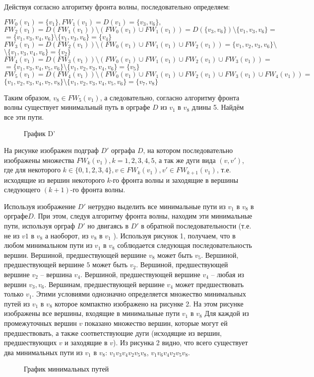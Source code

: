 \documentclass[12pt, letterpaper, titlepage]{article}
\begin{document}
Действуя согласно алгоритму фронта волны, последовательно определяем:

$FW_0(v_1)=\{v_1\}, FW_1(v_1)=D(v_1)=\{v_3,v_6\},$\\
$FW_2(v_1)=D(FW_1(v_1)) \setminus (FW_0(v_1) \cup FW_1(v_1))=D(\{v_3,v_6\}) \setminus \{v_1,v_3,v_6\}=$\\
$=\{v_1,v_3,v_4,v_6\} \setminus \{v_1,v_3,v_6\}=\{v_4\}$\\
$FW_3(v_1)=D(FW_2(v_1)) \setminus (FW_0(v_1)\cup FW_1(v_1)\cup FW_2(v_1))=\{v_1,v_2,v_3,v_6\} \setminus$\\
$\setminus \{v_1,v_3,v_4,v_6\}=\{v_2\}$\\
$FW_4(v_1)=D(FW_3(v_1)) \setminus (FW_0(v_1)\cup FW_1(v_1)\cup FW_2(v_1)\cup FW_3(v_1))=$\\
$=\{v_1,v_3,v_4,v_5,v_6\} \setminus \{v_1,v_2,v_3,v_4,v_6\}=\{v_5\}$\\
$FW_5(v_1)=D(FW_4(v_1)) \setminus (FW_0(v_1)\cup FW_1(v_1)\cup FW_2(v_1)\cup FW_3(v_1)\cup FW_4(v_1))=$\\
$\{v_1,v_2,v_3,v_4,v_7,v_8\}\setminus \{v_1,v_2,v_3,v_4,v_5,v_6\}=\{v_7,v_8\}$

Таким образом, $v_8 \in FW_5(v_1)$, а следовательно, согласно алгоритму фронта волны существует минимальный
путь в орграфе $D$ из $v_1$ в $v_8$ длины 5. Найдём все эти пути.
\begin{figure}[H]\centering\caption{График D'}\end{figure}
На рисунке изображен подграф $D'$ орграфа $D$, на котором последовательно изображены множества
$FW_k(v_1), k=1,2,3,4,5$, а так же  дуги вида $(v, v')$, где для некоторого $k \in \{0,1,2,3,4\},
v \in FW_k(v_1), v' \in FW_{k+1}(v_1)$, т.е. исходящие из вершин некоторого $k$-го фронта волны и
заходящие в вершины следующего $(k+1)$-го фронта волны.

Используя изображение $D'$ нетрудно выделить все минимальные пути из $v_1$ в $v_8$
в орграфе$D$. При этом, следуя алгоритму фронта волны, находим эти минимальные пути, используя орграф $D'$
но двигаясь в $D'$ в обратной последовательности (т.е. не из $v1$ в $v_8$ а наоборот, из $v_8$
в $v_1$ ). Используя рисунок 1, получаем, что в любом минимальном пути из $v_1$ в $v_8$
соблюдается следующая последовательность вершин. Вершиной, предшествующей
вершине $v_8$ может быть $v_5$. Вершиной, предшествующей вершине $5$
может быть $v_2$. Вершиной, предшествующей вершине $v_2$ – вершина $v_4$. 
Вершиной, предшествующей вершине $v_4$ – любая из вершин $v_3,v_6$. 
Вершинам, предшествующей вершине $v_4$ может предшествовать только $v_1$. Этими условиями однозначно определяется множество
минимальных путей из $v_1$ в $v_8$ которое компактно изображено на рисунке 2. На этом
рисунке изображены все вершины, входящие в минимальные пути $v_1$ в $v_8$ Для каждой
из промежуточных вершин $v$ показано множество вершин, которые могут ей
предшествовать, а также соответствующие дуги (исходящие из вершин, предшествующих $v$
и заходящие в $v$). Из рисунка 2 видно, что всего существует два минимальных пути из $v_1$ в
$v_8$: $v_1v_3v_4v_2v_5v_8$, $v_1v_6v_4v_2v_5v_8$.
\begin{figure}[H]\centering\caption{График минимальных путей}\end{figure}
\end{document}

